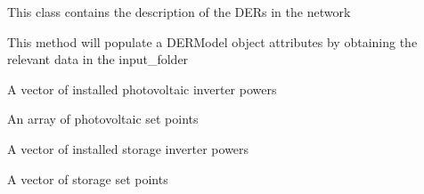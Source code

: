 \documentclass[letterpaper,10pt,english]{sphinxmanual}
\begin{document}
\begin{fulllineitems}
\label{ropf:ropf.Simulation.DERModel}
This class contains the description of the DERs in the network

\begin{fulllineitems}
\label{ropf:ropf.Simulation.DERModel.init_dermodel}
This method will populate a DERModel object attributes by obtaining the relevant
data in the input\_folder

\end{fulllineitems}


\begin{fulllineitems}
\label{ropf:ropf.Simulation.DERModel.pv_inverter_power}
A vector of installed photovoltaic inverter powers

\end{fulllineitems}


\begin{fulllineitems}
\label{ropf:ropf.Simulation.DERModel.pv_set_points}
An array of photovoltaic set points

\end{fulllineitems}


\begin{fulllineitems}
\label{ropf:ropf.Simulation.DERModel.storage_inverter_power}
A vector of installed storage inverter powers

\end{fulllineitems}


\begin{fulllineitems}
\label{ropf:ropf.Simulation.DERModel.storage_set_points}
A vector of storage set points

\end{fulllineitems}


\end{fulllineitems}
\end{document}

